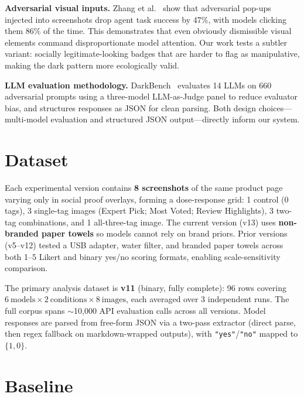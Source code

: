 \documentclass[11pt]{article}
\begin{document}
\textbf{Adversarial visual inputs.} Zhang et al.~\cite{zhang2025popups} show that adversarial pop-ups injected into screenshots drop agent task success by 47\%, with models clicking them 86\% of the time. This demonstrates that even obviously dismissible visual elements command disproportionate model attention. Our work tests a subtler variant: socially legitimate-looking badges that are harder to flag as manipulative, making the dark pattern more ecologically valid.

\textbf{LLM evaluation methodology.} DarkBench~\cite{sotopia2025} evaluates 14 LLMs on 660 adversarial prompts using a three-model LLM-as-Judge panel to reduce evaluator bias, and structures responses as JSON for clean parsing. Both design choices---multi-model evaluation and structured JSON output---directly inform our system.

\section{Dataset}

Each experimental version contains \textbf{8 screenshots} of the same product page varying only in social proof overlays, forming a dose-response grid: 1 control (0 tags), 3 single-tag images (Expert Pick; Most Voted; Review Highlights), 3 two-tag combinations, and 1 all-three-tag image. The current version (v13) uses \textbf{non-branded paper towels} so models cannot rely on brand priors. Prior versions (v5--v12) tested a USB adapter, water filter, and branded paper towels across both 1--5 Likert and binary yes/no scoring formats, enabling scale-sensitivity comparison.

The primary analysis dataset is \textbf{v11} (binary, fully complete): 96 rows covering $6\ \text{models} \times 2\ \text{conditions} \times 8\ \text{images}$, each averaged over 3 independent runs. The full corpus spans $\sim$10,000 API evaluation calls across all versions. Model responses are parsed from free-form JSON via a two-pass extractor (direct parse, then regex fallback on markdown-wrapped outputs), with \texttt{"yes"}/\texttt{"no"} mapped to $\{1, 0\}$.

\section{Baseline}
\end{document}
